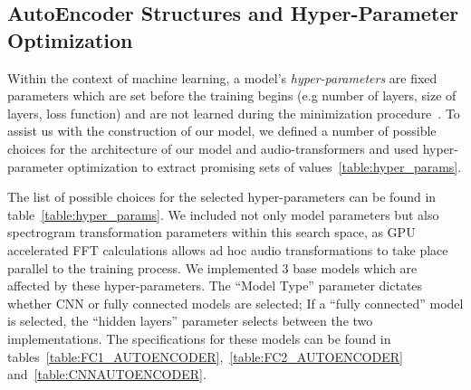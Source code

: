 \documentclass[runningheads,a4paper]{llncs}
\begin{document}
\begin{appendices}
\chapter{AutoEncoder Structures and Hyper-Parameter Optimization}
\label{appendix:hyperparam}
Within the context of machine learning, a model's \emph{hyper-parameters} are fixed parameters which are set before the training begins (e.g number of layers, size of layers, loss function) and are not learned during the minimization procedure~\cite{bengio2000gradient}. To assist us with the construction of our model, we defined a number of possible choices for the architecture of our model and audio-transformers and used hyper-parameter optimization to extract promising sets of values~\ref{table:hyper_params}. 

The list of possible choices for the selected hyper-parameters can be found in table~\ref{table:hyper_params}. We included not only model parameters but also spectrogram transformation parameters within this search space, as GPU accelerated FFT calculations allows ad hoc audio transformations to take place parallel to the training process. We implemented 3 base models which are affected by these hyper-parameters. The \enquote{Model Type} parameter dictates whether CNN or fully connected models are selected; If a \enquote{fully connected} model is selected, the \enquote{hidden layers} parameter selects between the two implementations. The specifications for these models can be found in tables~\ref{table:FC1_AUTOENCODER},~\ref{table:FC2_AUTOENCODER} and~\ref{table:CNNAUTOENCODER}.


\end{appendices}
\end{document}
